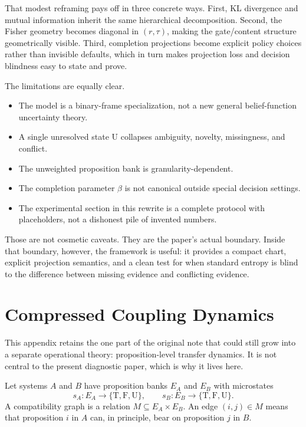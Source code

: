\documentclass[11pt]{article}
\newcommand{\T}{\mathrm{T}}
\newcommand{\F}{\mathrm{F}}
\newcommand{\U}{\mathrm{U}}
\newcommand{\1}{\mathbf{1}}
\begin{document}
That modest reframing pays off in three concrete ways. First, KL divergence and mutual information inherit the same hierarchical decomposition. Second, the Fisher geometry becomes diagonal in $(r,\tau)$, making the gate/content structure geometrically visible. Third, completion projections become explicit policy choices rather than invisible defaults, which in turn makes projection loss and decision blindness easy to state and prove.

The limitations are equally clear.
\begin{itemize}[leftmargin=1.5em]
    \item The model is a binary-frame specialization, not a new general belief-function uncertainty theory.
    \item A single unresolved state $\U$ collapses ambiguity, novelty, missingness, and conflict.
    \item The unweighted proposition bank is granularity-dependent.
    \item The completion parameter $\beta$ is not canonical outside special decision settings.
    \item The experimental section in this rewrite is a complete protocol with placeholders, not a dishonest pile of invented numbers.
\end{itemize}

Those are not cosmetic caveats. They are the paper's actual boundary. Inside that boundary, however, the framework is useful: it provides a compact chart, explicit projection semantics, and a clean test for when standard entropy is blind to the difference between missing evidence and conflicting evidence.

\appendix

\section{Compressed Coupling Dynamics}
\label{app:coupling}

This appendix retains the one part of the original note that could still grow into a separate operational theory: proposition-level transfer dynamics. It is not central to the present diagnostic paper, which is why it lives here.

Let systems $A$ and $B$ have proposition banks $E_A$ and $E_B$ with microstates
\[
s_A:E_A\to\{\T,\F,\U\},
\qquad
s_B:E_B\to\{\T,\F,\U\}.
\]
A compatibility graph is a relation $M\subseteq E_A\times E_B$. An edge $(i,j)\in M$ means that proposition $i$ in $A$ can, in principle, bear on proposition $j$ in $B$.
\end{document}
